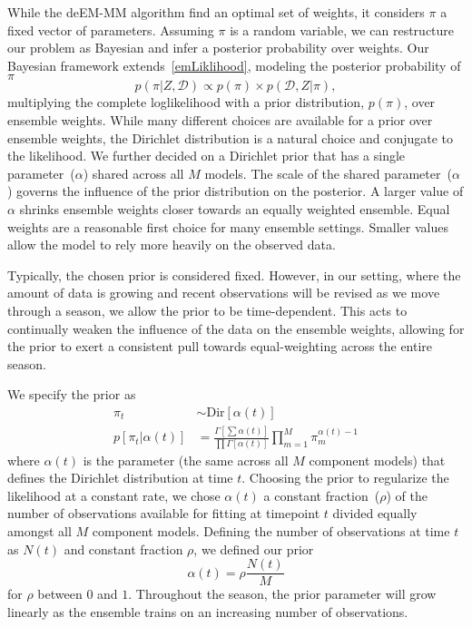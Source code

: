 \documentclass[12pt]{article}
\def\l{\left}
\def\r{\right}
\newcommand{\f}{\frac}
\begin{document}
While the deEM-MM algorithm find an optimal set of weights, it considers $\pi$ a fixed vector of parameters.
Assuming $\pi$ is a random variable, we can restructure our problem as Bayesian and infer a posterior probability over weights.
Our Bayesian framework extends~\eqref{emLiklihood}, modeling the posterior probability of $\pi$
\begin{equation}
  p(\pi | Z, \mathcal{D}) \propto p(\pi) \times p(\mathcal{D},Z | \pi),
\end{equation}
multiplying the complete loglikelihood with a prior distribution, $p(\pi)$, over ensemble weights.
While many different choices are available for a prior over ensemble weights, the Dirichlet distribution is a natural choice and conjugate to the likelihood.
We further decided on a Dirichlet prior that has a single parameter~($\alpha$) shared across all $M$ models. 
The scale of the shared parameter~($\alpha$) governs the influence of the prior distribution on the posterior.
A larger value of $\alpha$ shrinks ensemble weights closer towards an equally weighted ensemble.
Equal weights are a reasonable first choice for many ensemble settings.
Smaller values allow the model to rely more heavily on the observed data. 

Typically, the chosen prior is considered fixed. 
However, in our setting, where the amount of data is growing and recent observations will be revised as we move through a season, we allow the prior to be time-dependent.
This acts to continually weaken the influence of the data on the ensemble weights, allowing for the prior to exert a consistent pull towards equal-weighting across the entire season.

We specify the prior as 
\begin{align*}
    \pi_{t} &\sim \text{Dir} \l[\alpha(t)\r]\\
    p[\pi_{t} | \alpha(t)] &= \f{\Gamma \l[\sum \alpha(t) \r]}{\prod \Gamma\l[\alpha(t)\r]} \prod_{m=1}^{M}\pi_m^{\alpha(t)-1}
\end{align*}
where $\alpha(t)$ is the parameter (the same across all $M$ component models) that defines the Dirichlet distribution at time $t$.
Choosing the prior to regularize the likelihood at a constant rate, we chose $\alpha(t)$ a constant fraction~($\rho$) of the number of observations available for fitting at timepoint $t$ divided equally amongst all $M$ component models.
Defining the number of observations at time $t$ as $N(t)$ and constant fraction $\rho$, we defined our prior
\begin{equation}
  \alpha(t) = \rho \f{N(t)}{M}
\end{equation}
for $\rho$ between $0$ and $1$.
Throughout the season, the prior parameter will grow linearly as the ensemble trains on an increasing number of observations.
\end{document}
